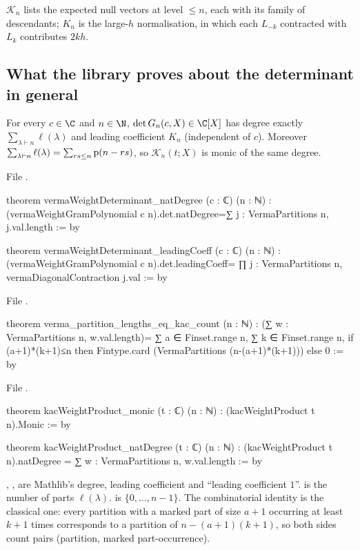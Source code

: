 \begin{physics}
$\mathcal K_n$ lists the expected null vectors at level $\le n$, each with its family of descendants;
$K_n$ is the large-$h$ normalisation, in which each $L_{-k}$ contracted with $L_k$ contributes $2kh$.
\end{physics}

\subsection{What the library proves about the determinant in general}

\begin{theorem}\label{l06:thm:degree}
For every $c\in\C$ and $n\in\N$, $\det G_n(c,X)\in\C[X]$ has degree exactly $\sum_{\lambda\vdash n}\ell(\lambda)$
and leading coefficient $K_n$ (independent of $c$). Moreover
$\sum_{\lambda\vdash n}\ell(\lambda) = \sum_{rs\le n}\mathrm{p}(n-rs)$, so $\mathcal K_n(t;X)$ is monic of the same
degree.
\end{theorem}

File .
\begin{leancode}
theorem vermaWeightDeterminant_natDegree (c : ℂ) (n : ℕ) :
    (vermaWeightGramPolynomial c n).det.natDegree=∑ j : VermaPartitions n, j.val.length := by

theorem vermaWeightDeterminant_leadingCoeff (c : ℂ) (n : ℕ) :
    (vermaWeightGramPolynomial c n).det.leadingCoeff=
      ∏ j : VermaPartitions n, vermaDiagonalContraction j.val := by
\end{leancode}
File .
\begin{leancode}
theorem verma_partition_lengths_eq_kac_count (n : ℕ) :
    (∑ w : VermaPartitions n, w.val.length)=
      ∑ a ∈ Finset.range n, ∑ k ∈ Finset.range n,
        if (a+1)*(k+1)≤n then
          Fintype.card (VermaPartitions (n-(a+1)*(k+1))) else 0 := by
\end{leancode}
File .
\begin{leancode}
theorem kacWeightProduct_monic (t : ℂ) (n : ℕ) : (kacWeightProduct t n).Monic := by

theorem kacWeightProduct_natDegree (t : ℂ) (n : ℕ) :
    (kacWeightProduct t n).natDegree = ∑ w : VermaPartitions n, w.val.length := by
\end{leancode}

\begin{dictionary}
, ,  are Mathlib's degree, leading coefficient and
``leading coefficient $1$''.  is the number of parts $\ell(\lambda)$.
 is $\{0,\dots,n-1\}$. The combinatorial identity is the classical one: every
partition with a marked part of size $a+1$ occurring at least $k+1$ times corresponds to a partition of
$n-(a+1)(k+1)$, so both sides count pairs (partition, marked part-occurrence).
\end{dictionary}

